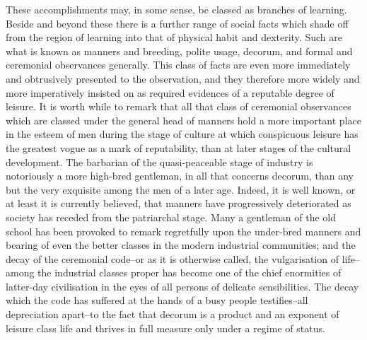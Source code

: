 \documentclass[12pt]{report}
\begin{document}
These accomplishments may, in some sense, be classed as branches of
learning. Beside and beyond these there is a further range of social
facts which shade off from the region of learning into that of physical
habit and dexterity. Such are what is known as manners and breeding,
polite usage, decorum, and formal and ceremonial observances generally.
This class of facts are even more immediately and obtrusively presented
to the observation, and they therefore more widely and more imperatively
insisted on as required evidences of a reputable degree of leisure. It
is worth while to remark that all that class of ceremonial observances
which are classed under the general head of manners hold a more
important place in the esteem of men during the stage of culture
at which conspicuous leisure has the greatest vogue as a mark of
reputability, than at later stages of the cultural development. The
barbarian of the quasi-peaceable stage of industry is notoriously a more
high-bred gentleman, in all that concerns decorum, than any but the very
exquisite among the men of a later age. Indeed, it is well known, or
at least it is currently believed, that manners have progressively
deteriorated as society has receded from the patriarchal stage. Many a
gentleman of the old school has been provoked to remark regretfully upon
the under-bred manners and bearing of even the better classes in the
modern industrial communities; and the decay of the ceremonial code--or
as it is otherwise called, the vulgarisation of life--among the
industrial classes proper has become one of the chief enormities
of latter-day civilisation in the eyes of all persons of delicate
sensibilities. The decay which the code has suffered at the hands of a
busy people testifies--all depreciation apart--to the fact that decorum
is a product and an exponent of leisure class life and thrives in full
measure only under a regime of status.
\end{document}
